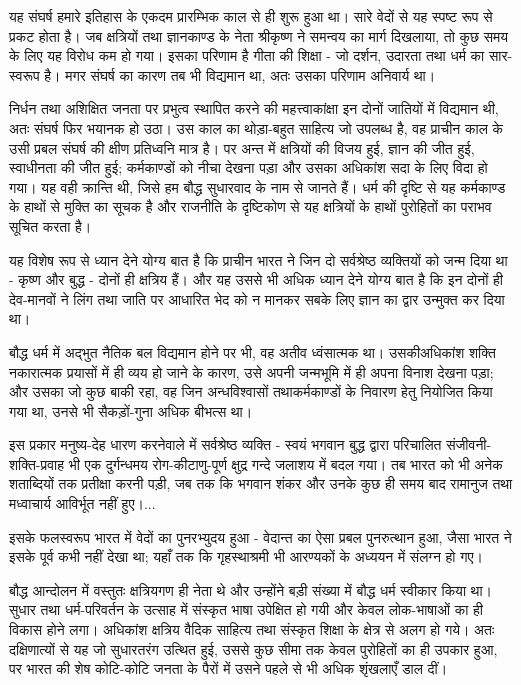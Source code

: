 यह संघर्ष हमारे इतिहास के एकदम प्रारम्भिक काल से ही शुरू हुआ था। सारे वेदों से यह स्पष्ट रूप से प्रकट होता है। जब क्षत्रियों तथा ज्ञानकाण्ड के नेता श्रीकृष्ण ने समन्वय का मार्ग दिखलाया, तो कुछ समय के लिए यह विरोध कम हो गया। इसका परिणाम है गीता की शिक्षा - जो दर्शन, उदारता तथा धर्म का सार-स्वरूप है। मगर संघर्ष का कारण तब भी विद्यमान था, अतः उसका परिणाम अनिवार्य था। 

\newpage

निर्धन तथा अशिक्षित जनता पर प्रभुत्व स्थापित करने की महत्त्वाकांक्षा इन दोनों जातियों में विद्यमान थी, अतः संघर्ष फिर भयानक हो उठा। उस काल का थोड़ा-बहुत साहित्य जो उपलब्ध है, वह प्राचीन काल के उसी प्रबल संघर्ष की क्षीण प्रतिध्वनि मात्र है। पर अन्त में क्षत्रियों की विजय हुई, ज्ञान की जीत हुई, स्वाधीनता की जीत हुई; कर्मकाण्डों को नीचा देखना पड़ा और उसका अधिकांश सदा के लिए विदा हो गया। यह वही क्रान्ति थी, जिसे हम बौद्ध सुधारवाद के नाम से जानते हैं। धर्म की दृष्टि से यह कर्मकाण्ड के हाथों से मुक्ति का सूचक है और राजनीति के दृष्टिकोण से यह क्षत्रियों के हाथों पुरोहितों का पराभव सूचित करता है। 

यह विशेष रूप से ध्यान देने योग्य बात है कि प्राचीन भारत ने जिन दो सर्वश्रेष्ठ व्यक्तियों को जन्म दिया था - कृष्ण और बुद्ध - दोनों ही क्षत्रिय हैं। और यह उससे भी अधिक ध्यान देने योग्य बात है कि इन दोनों ही देव-मानवों ने लिंग तथा जाति पर आधारित भेद को न मानकर सबके लिए ज्ञान का द्वार उन्मुक्त कर दिया था। 

बौद्ध धर्म में अद्भुत नैतिक बल विद्यमान होने पर भी, वह अतीव ध्वंसात्मक था। उसकी\break अधिकांश शक्ति नकारात्मक प्रयासों में ही व्यय हो जाने के कारण, उसे अपनी जन्मभूमि में ही अपना विनाश देखना पड़ा; और उसका जो कुछ बाकी रहा, वह जिन अन्धविश्वासों तथा\break कर्मकाण्डों के निवारण हेतु नियोजित किया गया था, उनसे भी सैकड़ों-गुना अधिक बीभत्स था। 

इस प्रकार मनुष्य-देह धारण करनेवाले में सर्वश्रेष्ठ व्यक्ति - स्वयं भगवान बुद्ध द्वारा परिचालित संजीवनी-शक्ति-प्रवाह भी एक दुर्गन्धमय रोग-कीटाणु-पूर्ण क्षुद्र गन्दे जलाशय में बदल गया। तब भारत को भी अनेक शताब्दियों तक प्रतीक्षा करनी पड़ी, जब तक कि भगवान शंकर और उनके कुछ ही समय बाद रामानुज तथा मध्वाचार्य आविर्भूत नहीं हुए।... 

इसके फलस्वरूप भारत में वेदों का पुनरभ्युदय हुआ - वेदान्त का ऐसा प्रबल पुनरुत्थान हुआ, जैसा भारत ने इसके पूर्व कभी नहीं देखा था; यहाँ तक कि गृहस्थाश्रमी भी आरण्यकों के अध्ययन में संलग्न हो गए। 

बौद्ध आन्दोलन में वस्तुतः क्षत्रियगण ही नेता थे और उन्होंने बड़ी संख्या में बौद्ध धर्म स्वीकार किया था। सुधार तथा धर्म-परिवर्तन के उत्साह में संस्कृत भाषा उपेक्षित हो गयी और केवल लोक-भाषाओं का ही विकास होने लगा। अधिकांश क्षत्रिय वैदिक साहित्य तथा संस्कृत शिक्षा के क्षेत्र से अलग हो गये। अतः दक्षिणात्यों से यह जो सुधारतरंग उत्थित हुई, उससे कुछ सीमा तक केवल पुरोहितों का ही उपकार हुआ, पर भारत की शेष कोटि-कोटि जनता के पैरों में उसने पहले से भी अधिक शृंखलाएँ डाल दीं। 

